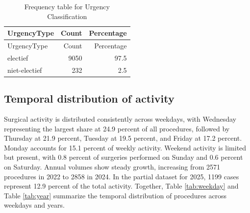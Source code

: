 \documentclass[
]{article}
\begin{document}
\begin{longtable}[]{@{}lrr@{}}
\caption{Frequency table for Urgency Classification
\label{tab:urgencytype}}\tabularnewline
\toprule\noalign{}
UrgencyType & Count & Percentage \\
\midrule\noalign{}
\endfirsthead
\toprule\noalign{}
UrgencyType & Count & Percentage \\
\midrule\noalign{}
\endhead
\bottomrule\noalign{}
\endlastfoot
electief & 9050 & 97.5 \\
niet-electief & 232 & 2.5 \\
\end{longtable}

\subsection{Temporal distribution of
activity}\label{temporal-distribution-of-activity}

Surgical activity is distributed consistently across weekdays, with
Wednesday representing the largest share at 24.9 percent of all
procedures, followed by Thursday at 21.9 percent, Tuesday at 19.5
percent, and Friday at 17.2 percent. Monday accounts for 15.1 percent of
weekly activity. Weekend activity is limited but present, with 0.8
percent of surgeries performed on Sunday and 0.6 percent on Saturday.
Annual volumes show steady growth, increasing from 2571 procedures in
2022 to 2858 in 2024. In the partial dataset for 2025, 1199 cases
represent 12.9 percent of the total activity. Together, Table
\ref{tab:weekday} and Table \ref{tab:year} summarize the temporal
distribution of procedures across weekdays and years.
\end{document}
